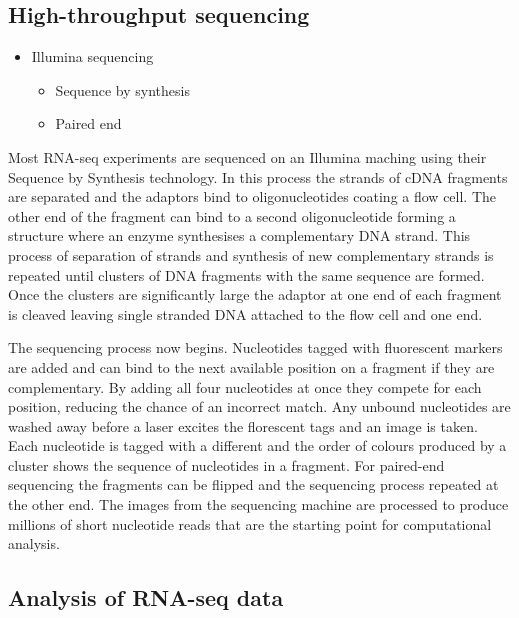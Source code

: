 \documentclass[11pt,a4paper,titlepage,twoside,openright]{style/unimelbthesis}
\theoremstyle{definition}
\theoremstyle{definition}
\theoremstyle{definition}
\theoremstyle{remark}
\begin{document}
\begin{mainmatter}
\hypertarget{high-throughput-sequencing}{%
\subsection{High-throughput sequencing}\label{high-throughput-sequencing}}

\begin{itemize}
\tightlist
\item
  Illumina sequencing

  \begin{itemize}
  \tightlist
  \item
    Sequence by synthesis
  \item
    Paired end
  \end{itemize}
\end{itemize}

Most RNA-seq experiments are sequenced on an Illumina maching using their Sequence by Synthesis technology. In this process the strands of cDNA fragments are separated and the adaptors bind to oligonucleotides coating a flow cell. The other end of the fragment can bind to a second oligonucleotide forming a structure where an enzyme synthesises a complementary DNA strand. This process of separation of strands and synthesis of new complementary strands is repeated until clusters of DNA fragments with the same sequence are formed. Once the clusters are significantly large the adaptor at one end of each fragment is cleaved leaving single stranded DNA attached to the flow cell and one end.

The sequencing process now begins. Nucleotides tagged with fluorescent markers are added and can bind to the next available position on a fragment if they are complementary. By adding all four nucleotides at once they compete for each position, reducing the chance of an incorrect match. Any unbound nucleotides are washed away before a laser excites the florescent tags and an image is taken. Each nucleotide is tagged with a different and the order of colours produced by a cluster shows the sequence of nucleotides in a fragment. For paired-end sequencing the fragments can be flipped and the sequencing process repeated at the other end. The images from the sequencing machine are processed to produce millions of short nucleotide reads that are the starting point for computational analysis.

\hypertarget{analysis-of-rna-seq-data}{%
\subsection{Analysis of RNA-seq data}\label{analysis-of-rna-seq-data}}


\end{mainmatter}
\end{document}
